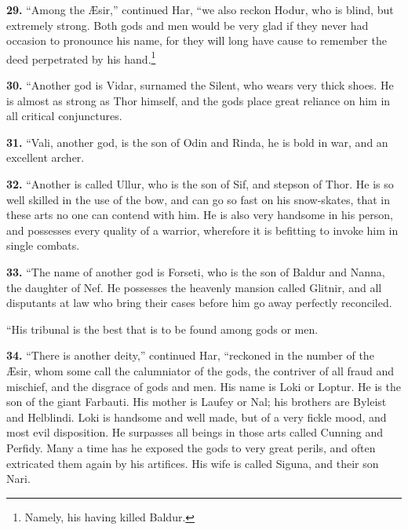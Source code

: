 
\textbf{29.} ``Among the Æsir,'' continued Har, ``we also reckon Hodur, who is
blind, but extremely strong. Both gods and men would be very glad if
they never had occasion to pronounce his name, for they will long have
cause to remember the deed perpetrated by his hand.\footnote{Namely, his having killed Baldur.}

\textbf{30.} ``Another god is Vidar, surnamed the Silent, who wears very thick
shoes. He is almost as strong as Thor himself, and the gods place
great reliance on him in all critical conjunctures.

\textbf{31.} ``Vali, another god, is the son of Odin and Rinda, he is bold in
war, and an excellent archer.

\textbf{32.} ``Another is called Ullur, who is the son of Sif, and stepson of
Thor. He is so well skilled in the use of the bow, and can go so fast
on his snow-skates, that in these arts no one can contend with him. He
is also very handsome in his person, and possesses every quality of a
warrior, wherefore it is befitting to invoke him in single combats.

\textbf{33.} ``The name of another god is Forseti, who is the son of Baldur
and Nanna, the daughter of Nef. He possesses the heavenly mansion
called Glitnir, and all disputants at law who bring their cases before
him go away perfectly reconciled.

``His tribunal is the best that is to be found among gods or men.


\textbf{34.} ``There is another deity,'' continued Har, ``reckoned in the number
of the Æsir, whom some call the calumniator of the gods, the contriver
of all fraud and mischief, and the disgrace of gods and men. His name
is Loki or Loptur. He is the son of the giant Farbauti. His mother is
Laufey or Nal; his brothers are Byleist and Helblindi. Loki is
handsome and well made, but of a very fickle mood, and most evil
disposition. He surpasses all beings in those arts called Cunning and
Perfidy. Many a time has he exposed the gods to very great perils, and
often extricated them again by his artifices. His wife is called
Siguna, and their son Nari.

